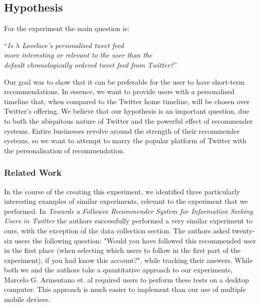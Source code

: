\documentclass{article}
\begin{document}
\subsection{Hypothesis}
%
%
For the experiment the main question is: %

\begin{center}
    ``\textit{Is $\lambda$ Lovelace's personalised tweet feed \\
    more interesting or relevant to the user than the \\
    default chronologically ordered tweet feed from Twitter?}''
\end{center}

Our goal was to show that it can be preferable for the user to have short-term recommendations. In essence, we want to provide users with a personalised timeline that, when compared to the Twitter home timeline, will be chosen over Twitter's offering. We believe that our hypothesis is an important question, due to both the ubiquitous nature of Twitter and the powerful effect of recommender systems. Entire businesses revolve around the strength of their recommender systems, so we want to attempt to marry the popular platform of Twitter with the personalisation of recommendation.

\subsubsection*{Related Work} %
In the course of the creating this experiment, we identified three particularly interesting examples of similar experiments, relevant to the experiment that we performed. In \textit{Towards a Followee Recommender System for Information Seeking Users in Twitter} \cite{paper1} the authors successfully performed a very similar experiment to ours, with the exception of the data collection section. The authors asked twenty-six users the following question: "Would you have followed this recommended user in the first place (when selecting which users to follow in the first part of the experiment), if you had know this account?", while tracking their answers. While both we and the authors take a quantitative approach to our experiments, Marcelo G. Armentano et. al required users to perform these tests on a desktop computer. This approach is much easier to implement than our use of multiple mobile devices. 
\end{document}
